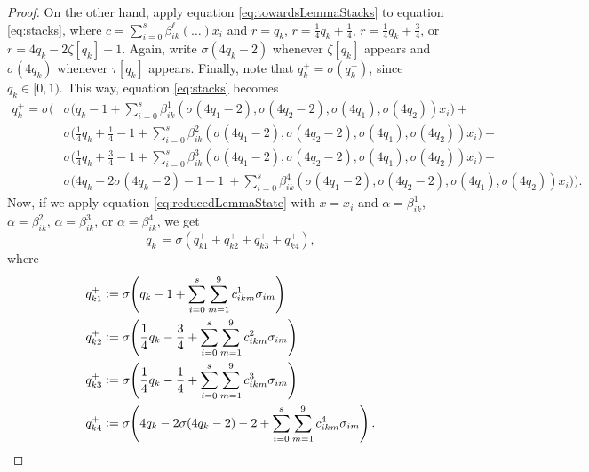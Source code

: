 \documentclass{book}
\newcommand{\defeq}{\vcentcolon=}
\theoremstyle{definition}
\theoremstyle{plain}
\theoremstyle{plain}
\theoremstyle{remark}
\theoremstyle{plain}
\begin{document}
\begin{proof}
		On the other hand, apply equation \ref{eq:towardsLemmaStacks} to equation \ref{eq:stacks}, where $c=\sum_{i=0}^{s}\beta_{ik}^\ell(\dots)x_i$ and $r=q_k$, $r=\frac{1}{4}q_k+\frac{1}{4}$, $r=\frac{1}{4}q_k+\frac{3}{4}$, or $r=4q_k-2\zeta[q_k]-1$. Again, write $\sigma(4q_k-2)$ whenever $\zeta[q_k]$ appears and $\sigma(4q_k)$ whenever $\tau[q_k]$ appears. Finally, note that $q_k^+=\sigma\!\left(q_k^+\right)$, since $q_k\in[0,1)$. This way, equation \ref{eq:stacks} becomes
		\begin{align*}  
			q_k^+=\sigma\Bigg(&\sigma\Bigg(q_k-1+\sum_{i=0}^{s}\beta_{ik}^1(
								  \sigma(4q_1-2),\sigma(4q_2-2),\sigma(4q_1),\sigma(4q_2))x_i\Bigg)+ \\
							  &\sigma\Bigg(\frac{1}{4}q_k+\frac{1}{4}-1+\sum_{i=0}^{s}\beta_{ik}^2(
								  \sigma(4q_1-2),\sigma(4q_2-2),\sigma(4q_1),\sigma(4q_2))x_i\Bigg)+ \\
							  &\sigma\Bigg(\frac{1}{4}q_k+\frac{3}{4}-1+\sum_{i=0}^{s}\beta_{ik}^3(
								  \sigma(4q_1-2),\sigma(4q_2-2),\sigma(4q_1),\sigma(4q_2))x_i\Bigg)+ \\
							  &\sigma\Bigg(4q_k-2\sigma(4q_k-2)-1-1\:+\sum_{i=0}^{s}\beta_{ik}^4(
								  \sigma(4q_1-2),\sigma(4q_2-2),\sigma(4q_1),\sigma(4q_2))x_i\Bigg)\Bigg).
		\end{align*}
		Now, if we apply equation \ref{eq:reducedLemmaState} with $x=x_i$ and $\alpha=\beta_{ik}^1$, $\alpha=\beta_{ik}^2$, $\alpha=\beta_{ik}^3$, or $\alpha=\beta_{ik}^4$, we get
		\begin{equation} \label{eq:netStacks}
			q_k^+=\sigma\!\left(q_{k1}^++q_{k2}^++q_{k3}^++q_{k4}^+\right),
		\end{equation}
		where 
		\begin{align} \label{eq:q_kl+}
			\begin{split}
				q_{k1}^+\defeq\sigma\!&\left(q_k-1+\sum_{i=0}^{s}\sum_{m=1}^{9}c_{ikm}^1\sigma_{im}\right) \\
				q_{k2}^+\defeq\sigma\!&\left(\frac{1}{4}q_k-\frac{3}{4}+\sum_{i=0}^{s}\sum_{m=1}^{9}c_{ikm}^2\sigma_{im}\right) \\
				q_{k3}^+\defeq\sigma\!&\left(\frac{1}{4}q_k-\frac{1}{4}+\sum_{i=0}^{s}\sum_{m=1}^{9}c_{ikm}^3\sigma_{im}\right) \\
				q_{k4}^+\defeq\sigma\!&\left(4q_k-2\sigma(4q_k-2)-2+\sum_{i=0}^{s}\sum_{m=1}^{9}c_{ikm}^4\sigma_{im}\right).
			\end{split}
		\end{align}
		

\end{proof}
\end{document}
